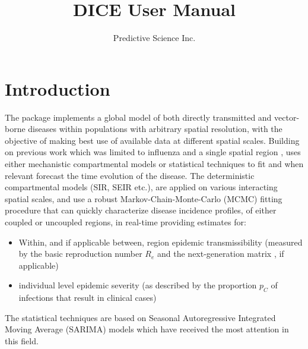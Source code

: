 \documentclass[a4paper]{article}
\title{DICE User Manual}
\author{Predictive Science Inc.}
\begin{document}

\maketitle

\setcounter{tocdepth}{2}
\tableofcontents

\section{Introduction}
\label{sec:intro}

The  package implements a global model of both directly transmitted and vector-borne diseases within populations with arbitrary spatial resolution, with the objective of making best use of available data at different spatial scales.  Building on previous work which was limited to influenza and a single spatial region \cite{riley13a, riley15a},  uses either mechanistic compartmental models or statistical techniques to fit and when relevant forecast the time evolution of the disease.   The deterministic compartmental models (SIR, SEIR etc.), are applied on various interacting spatial scales, and use a robust Markov-Chain-Monte-Carlo (MCMC) fitting procedure that can quickly characterize disease incidence profiles, of either coupled or uncoupled regions, in real-time providing estimates for:
\begin{itemize}
\item Within, and if applicable between, region epidemic transmissibility (measured by the basic reproduction number $R_e$ and the next-generation matrix \cite{mills2014spatial}, if applicable)
\item individual level epidemic severity (as described by the proportion $p_C$ of infections that result in clinical cases)
\end{itemize}
The statistical techniques are based on Seasonal Autoregressive Integrated Moving Average (SARIMA) models which have received the most attention in this field.
\end{document}
